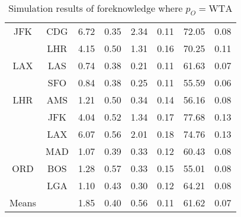 \begin{table}
\begin{center}
\begin{tabular}{c c | c c | c c | c | c }
JFK  &  CDG  &    6.72  &  0.35  &    2.34  &  0.11  &  72.05  &  0.08 \\
~    &  LHR  &    4.15  &  0.50  &    1.31  &  0.16  &  70.25  &  0.11 \\[.5ex]
LAX  &  LAS  &    0.74  &  0.38  &    0.21  &  0.11  &  61.63  &  0.07 \\
~    &  SFO  &    0.84  &  0.38  &    0.25  &  0.11  &  55.59  &  0.06 \\[.5ex]
LHR  &  AMS  &    1.21  &  0.50  &    0.34  &  0.14  &  56.16  &  0.08 \\
~    &  JFK  &    4.04  &  0.52  &    1.34  &  0.17  &  77.68  &  0.13 \\
~    &  LAX  &    6.07  &  0.56  &    2.01  &  0.18  &  74.76  &  0.13 \\
~    &  MAD  &    1.07  &  0.39  &    0.33  &  0.12  &  60.43  &  0.08 \\[.5ex]
ORD  &  BOS  &    1.28  &  0.57  &    0.33  &  0.15  &  55.01  &  0.08 \\
~    &  LGA  &    1.10  &  0.43  &    0.30  &  0.12  &  64.21  &  0.08 \\
\midrule
Means &  ~   &    1.85  &  0.40  &    0.56  &  0.11  &  61.62  &  0.07 \\
    \bottomrule
\end{tabular}
\caption{Simulation results of foreknowledge where $p_O = \mbox{WTA}$}
\label{tbl:resultsSecond}
\end{center}
\end{table}


